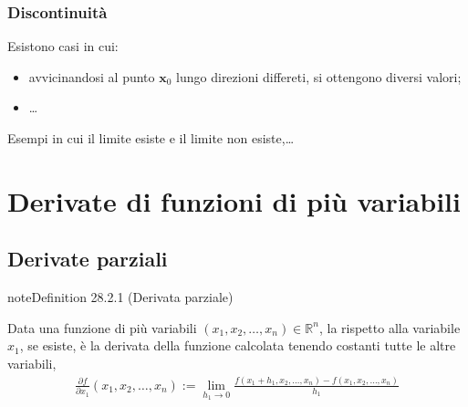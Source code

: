 \documentclass[letterpaper,10pt,italian]{jupyterBook}
\begin{document}
\subsubsection{Discontinuità}
\label{\detokenize{ch/multivariable-calculus/limits:discontinuita}}\label{\detokenize{ch/multivariable-calculus/limits:multivariable-calculus-discontinuity}}
\sphinxAtStartPar
Esistono casi in cui:
\begin{itemize}
\item {} 
\sphinxAtStartPar
avvicinandosi al punto \(\mathbf{x}_0\) lungo direzioni differeti, si ottengono diversi valori; 

\item {} 
\sphinxAtStartPar
…

\end{itemize}

\sphinxAtStartPar
{} Esempi in cui il limite esiste e il limite non esiste,…



\sphinxstepscope


\section{Derivate di funzioni di più variabili}
\label{\detokenize{ch/multivariable-calculus/derivatives:derivate-di-funzioni-di-piu-variabili}}\label{\detokenize{ch/multivariable-calculus/derivatives:multivariable-calculus-derivatives}}\label{\detokenize{ch/multivariable-calculus/derivatives::doc}}

\subsection{Derivate parziali}
\label{\detokenize{ch/multivariable-calculus/derivatives:derivate-parziali}}\label{ch/multivariable-calculus/derivatives:definition-0}
\begin{sphinxadmonition}{note}{Definition 28.2.1 (Derivata parziale)}



\sphinxAtStartPar
Data una funzione di più variabili \((x_1, x_2, \dots, x_n) \in \mathbb{R}^n\), la  rispetto alla variabile \(x_1\), se esiste, è la derivata della funzione calcolata tenendo costanti tutte le altre variabili,
\begin{equation*}
\begin{split}\frac{\partial f}{\partial x_1}(x_1, x_2, \dots, x_n) := \lim_{h_1 \rightarrow 0} \frac{f(x_1+h_1, x_2, \dots, x_n) - f(x_1, x_2, \dots, x_n)}{h_1}\end{split}
\end{equation*}\end{sphinxadmonition}
\end{document}
